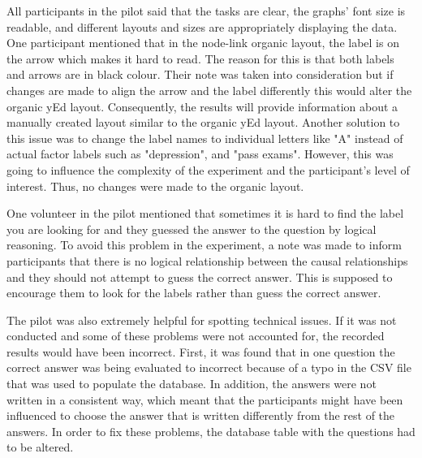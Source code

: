 \documentclass{l4proj}
\begin{document}
All participants in the pilot said that the tasks are clear, the graphs' font size is readable, and different layouts and sizes are appropriately displaying the data. One participant mentioned that in the node-link organic layout, the label is on the arrow which makes it hard to read. The reason for this is that both labels and arrows are in black colour. Their note was taken into consideration but if changes are made to align the arrow and the label differently this would alter the organic yEd layout. Consequently, the results will provide information about a manually created layout similar to the organic yEd layout. Another solution to this issue was to change the label names to individual letters like "A" instead of actual factor labels such as "depression", and "pass exams". However, this was going to influence the complexity of the experiment and the participant's level of interest. Thus, no changes were made to the organic layout.  

One volunteer in the pilot mentioned that sometimes it is hard to find the label you are looking for and they guessed the answer to the question by logical reasoning. To avoid this problem in the experiment, a note was made to inform participants that there is no logical relationship between the causal relationships and they should not attempt to guess the correct answer. This is supposed to encourage them to look for the labels rather than guess the correct answer. 

The pilot was also extremely helpful for spotting technical issues. If it was not conducted and some of these problems were not accounted for, the recorded results would have been incorrect. First, it was found that in one question the correct answer was being evaluated to incorrect because of a typo in the CSV file that was used to populate the database. In addition, the answers were not written in a consistent way, which meant that the participants might have been influenced to choose the answer that is written differently from the rest of the answers. In order to fix these problems, the database table with the questions had to be altered. 
\end{document}
